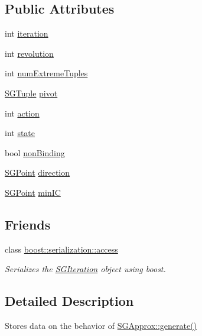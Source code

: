 \subsection*{Public Attributes}
\begin{DoxyCompactItemize}
\item 
int \hyperlink{classSGIteration_a44a4f9e3cb074181292ae816b2c28d9e}{iteration}
\item 
int \hyperlink{classSGIteration_a21cc5c4fc7c40ff444ac7e3743c13940}{revolution}
\item 
int \hyperlink{classSGIteration_a14ecfb94b3111911d9b0ef545f72e88d}{num\-Extreme\-Tuples}
\item 
\hyperlink{classSGTuple}{S\-G\-Tuple} \hyperlink{classSGIteration_abdae7d336968af3515e7d9590cbcc46d}{pivot}
\item 
int \hyperlink{classSGIteration_a554a41e3b428d0d05a1aec04b612cf3f}{action}
\item 
int \hyperlink{classSGIteration_a8f4cd9aa3ead30b86b081558f5a13147}{state}
\item 
bool \hyperlink{classSGIteration_a7520e6ea4903e8b32884294a3c65b331}{non\-Binding}
\item 
\hyperlink{classSGPoint}{S\-G\-Point} \hyperlink{classSGIteration_ac35e7e3049cd60c695a366cb8f75db37}{direction}
\item 
\hyperlink{classSGPoint}{S\-G\-Point} \hyperlink{classSGIteration_aa0deb29f2225a51bafa3dacc730fdb64}{min\-I\-C}
\end{DoxyCompactItemize}
\subsection*{Friends}
\begin{DoxyCompactItemize}
\item 
\hypertarget{classSGIteration_ac98d07dd8f7b70e16ccb9a01abf56b9c}{class \hyperlink{classSGIteration_ac98d07dd8f7b70e16ccb9a01abf56b9c}{boost\-::serialization\-::access}}\label{classSGIteration_ac98d07dd8f7b70e16ccb9a01abf56b9c}

\begin{DoxyCompactList}\small\item\em Serializes the \hyperlink{classSGIteration}{S\-G\-Iteration} object using boost. \end{DoxyCompactList}\end{DoxyCompactItemize}


\subsection{Detailed Description}
Stores data on the behavior of \hyperlink{classSGApprox_ac32645eb1ff336044f7ee5d523c610ce}{S\-G\-Approx\-::generate()} 

